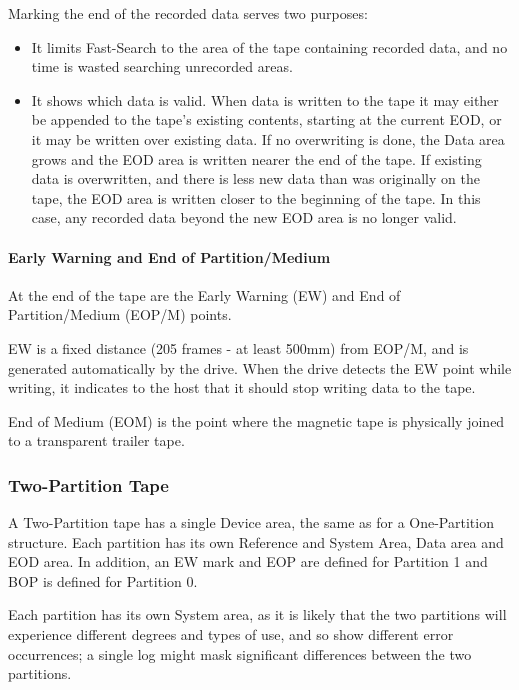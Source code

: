 Marking the end of the recorded data serves two purposes:

\begin {itemize}

\item It limits Fast-Search to the area of the tape containing recorded
data, and no time is wasted searching unrecorded areas.

\item It shows which data is valid. When data is written to the tape it may
either be appended to the tape's existing contents, starting at the current
EOD, or it may be written over existing data. If no overwriting is done, the
Data area grows and the EOD area is written nearer the end of the tape. If
existing data is overwritten, and there is less new data than was originally
on the tape, the EOD area is written closer to the beginning of the tape. In
this case, any recorded data beyond the new EOD area is no longer valid.

\end {itemize}

\paragraph {Early Warning and End of Partition/Medium}

At the end of the tape are the Early Warning (EW) and End of
Partition/Medium (EOP/M) points.

EW is a fixed distance (205 frames - at least 500mm) from EOP/M, and is
generated automatically by the drive. When the drive detects the EW point while
writing, it indicates to the host that it should stop writing data to the tape.

End of Medium (EOM) is the point where the magnetic tape is physically joined
to a transparent trailer tape.

\subsubsection {Two-Partition Tape}

A Two-Partition tape has a single Device area, the same as for a
One-Partition structure. Each partition has its own Reference and System
Area, Data area and EOD area. In addition, an EW mark and EOP are defined for
Partition 1 and BOP is defined for Partition 0.

Each partition has its own System area, as it is likely that the two
partitions will experience different degrees and types of use, and so show
different error occurrences; a single log might mask significant differences
between the two partitions.

